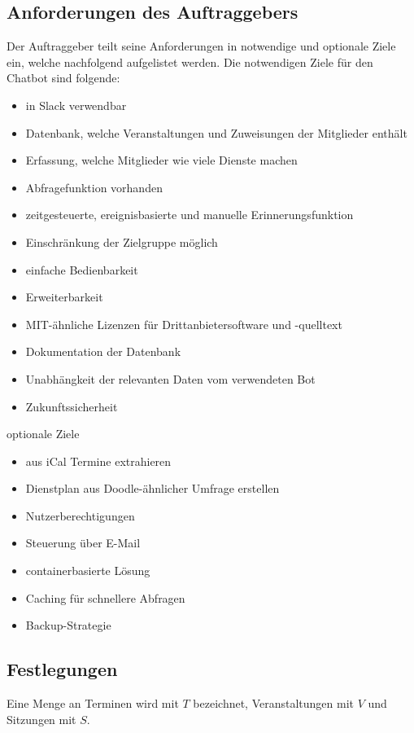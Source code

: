 \subsection{Anforderungen des Auftraggebers}
Der Auftraggeber teilt seine Anforderungen in notwendige und optionale Ziele ein, welche nachfolgend aufgelistet werden. Die notwendigen Ziele  für den Chatbot sind folgende:

\begin{itemize}
	\item in Slack verwendbar
	\item Datenbank, welche Veranstaltungen und Zuweisungen der Mitglieder enthält
	\item Erfassung, welche Mitglieder wie viele Dienste machen
	\item Abfragefunktion vorhanden
	\item zeitgesteuerte, ereignisbasierte und manuelle Erinnerungsfunktion
	\item Einschränkung der Zielgruppe möglich
	\item einfache Bedienbarkeit
	\item Erweiterbarkeit
	\item MIT-ähnliche Lizenzen für Drittanbietersoftware und -quelltext
	\item Dokumentation der Datenbank
	\item Unabhängkeit der relevanten Daten vom verwendeten Bot
	\item Zukunftssicherheit
\end{itemize}


optionale Ziele
\begin{itemize}
	\item aus iCal Termine extrahieren
	\item Dienstplan aus Doodle-ähnlicher Umfrage erstellen
	\item Nutzerberechtigungen
	\item Steuerung über E-Mail
	\item containerbasierte Lösung
	\item Caching für schnellere Abfragen
	\item Backup-Strategie
\end{itemize}


\subsection{Festlegungen}

Eine Menge an Terminen wird mit $T$ bezeichnet, Veranstaltungen mit $V$ und Sitzungen mit $S$.